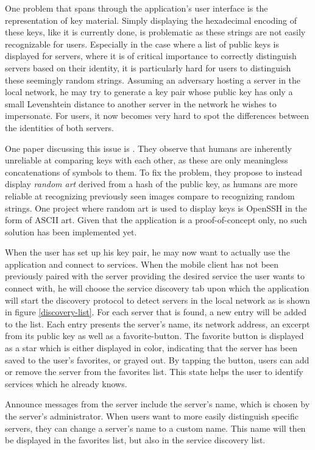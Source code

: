 One problem that spans through the application's user interface is the representation of key material.
Simply displaying the hexadecimal encoding of these keys, like it is currently done, is problematic as these strings are not easily recognizable for users.
Especially in the case where a list of public keys is displayed for servers, where it is of critical importance to correctly distinguish servers based on their identity, it is particularly hard for users to distinguish these seemingly random strings.
Assuming an adversary hosting a server in the local network, he may try to generate a key pair whose public key has only a small Levenshtein distance to another server in the network he wishes to impersonate.
For users, it now becomes very hard to spot the differences between the identities of both servers.

One paper discussing this issue is \cite{perrig1999hash}.
They observe that humans are inherently unreliable at comparing keys with each other, as these are only meaningless concatenations of symbols to them.
To fix the problem, they propose to instead display \emph{random art} derived from a hash of the public key, as humans are more reliable at recognizing previously seen images compare to recognizing random strings.
One project where random art is used to display keys is OpenSSH \cite{ylonen1996ssh} in the form of ASCII art.
Given that the application is a proof-of-concept only, no such solution has been implemented yet.

When the user has set up his key pair, he may now want to actually use the application and connect to services.
When the mobile client has not been previously paired with the server providing the desired service the user wants to connect with, he will choose the service discovery tab upon which the application will start the discovery protocol to detect servers in the local network as is shown in figure \ref{discovery-list}.
For each server that is found, a new entry will be added to the list.
Each entry presents the server's name, its network address, an excerpt from its public key as well as a favorite-button.
The favorite button is displayed as a star which is either displayed in color, indicating that the server has been saved to the user's favorites, or grayed out.
By tapping the button, users can add or remove the server from the favorites list.
This state helps the user to identify services which he already knows.

Announce messages from the server include the server's name, which is chosen by the server's administrator.
When users want to more easily distinguish specific servers, they can change a server's name to a custom name.
This name will then be displayed in the favorites list, but also in the service discovery list.


